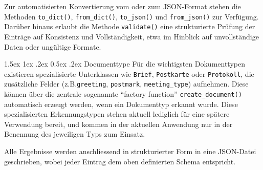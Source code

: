 \documentclass[12pt, a4paper, ngerman, bidi=default]{article}
\makeatletter
\newcommand{\code}[1]{\colorbox{VeryLightGray}{\texttt{#1}}} %
\let\oldparagraph\paragraph%
\renewcommand{\paragraph}{
    \@ifstar%
      \xxxParagraphStar%
      \xxxParagraphNoStar%
 }
\newcommand{\xxxParagraphStar}[1]{\oldparagraph*{#1}\mbox{}}
\newcommand{\xxxParagraphNoStar}[1]{\oldparagraph{#1}\mbox{}}
\renewcommand\paragraph{\@startsection{paragraph}{4}{0em}%
  {1.5ex \@plus1ex \@minus.2ex}%
  {0.5ex \@plus.2ex}%
  {\normalfont\normalsize\bfseries\itshape}}
\makeatother
\begin{document}
Zur automatisierten Konvertierung vom oder zum JSON-Format stehen die Methoden \code{to\_dict()}, \code{from\_dict()}, \code{to\_json()} und \code{from\_json()} zur Verfügung. Darüber hinaus erlaubt die Methode \code{validate()} eine strukturierte Prüfung der Einträge auf Konsistenz und Vollständigkeit, etwa im Hinblick auf unvollständige Daten oder ungültige Formate.

\paragraph{Documenttype}
Für die wichtigsten Dokumenttypen existieren spezialisierte Unterklassen wie \code{Brief}, 
\code{Postkarte} oder \code{Protokoll}, die zusätzliche Felder (z.B.\code{greeting}, \code{postmark}, \code{meeting\_type}) aufnehmen. 
Diese können über die zentrale sogenannte \enquote{factory function} \code{create\_document()} automatisch erzeugt werden, wenn ein Dokumenttyp erkannt wurde. 
Diese spezialisierten Erkennungstypen stehen aktuell lediglich für eine spätere Verwendung bereit, und kommen in der aktuellen Anwendung nur in der Benennung des jeweiligen Typs zum Einsatz.

Alle Ergebnisse werden anschliessend in strukturierter Form in eine JSON-Datei geschrieben, wobei jeder Eintrag dem oben definierten Schema 
entspricht. 
\end{document}

